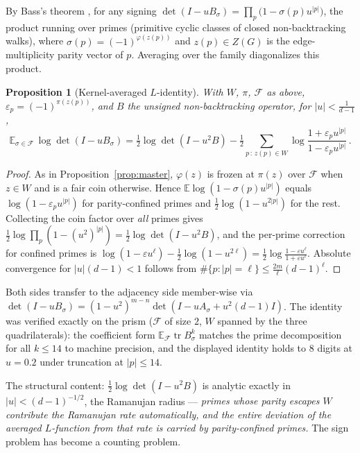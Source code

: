 \documentclass[11pt]{article}
\newtheorem{proposition}[lemma]{Proposition}
\theoremstyle{remark}
\DeclareMathOperator{\tr}{tr}
\begin{document}
By Bass's theorem \cite{bass92}, for any signing
$\det(I-uB_\sigma)=\prod_{p}\big(1-\sigma(p)u^{|p|}\big)$, the product
running over primes (primitive cyclic classes of closed non-backtracking
walks), where $\sigma(p)=(-1)^{\varphi(z(p))}$ and $z(p)\in Z(G)$ is the
edge-multiplicity parity vector of $p$. Averaging over the family
diagonalizes this product.

\begin{proposition}[Kernel-averaged $L$-identity]\label{prop:Lident}
With $W$, $\pi$, $\mathcal F$ as above, $\varepsilon_p=(-1)^{\pi(z(p))}$,
and $B$ the \emph{unsigned} non-backtracking operator, for
$|u|<\tfrac1{d-1}$,
\[
\mathbb E_{\sigma\in\mathcal F}\,\log\det(I-uB_\sigma)
=\tfrac12\log\det(I-u^2B)
-\tfrac12\!\!\sum_{p\,:\,z(p)\in W}\!\!
\log\frac{1+\varepsilon_pu^{|p|}}{1-\varepsilon_pu^{|p|}}\,.
\]
\end{proposition}

\begin{proof}
As in Proposition~\ref{prop:master}, $\varphi(z)$ is frozen at $\pi(z)$
over $\mathcal F$ when $z\in W$ and is a fair coin otherwise. Hence
$\mathbb E\log(1-\sigma(p)u^{|p|})$ equals
$\log(1-\varepsilon_pu^{|p|})$ for parity-confined primes and
$\tfrac12\log(1-u^{2|p|})$ for the rest. Collecting the coin factor over
\emph{all} primes gives
$\tfrac12\log\prod_p(1-(u^2)^{|p|})=\tfrac12\log\det(I-u^2B)$, and the
per-prime correction for confined primes is
$\log(1-\varepsilon u^{\ell})-\tfrac12\log(1-u^{2\ell})
=\tfrac12\log\frac{1-\varepsilon u^{\ell}}{1+\varepsilon u^{\ell}}$.
Absolute convergence for $|u|(d-1)<1$ follows from
$\#\{p:|p|=\ell\}\le\tfrac{2m}{\ell}(d-1)^{\ell}$.
\end{proof}

Both sides transfer to the adjacency side member-wise via
$\det(I-uB_\sigma)=(1-u^2)^{m-n}\det(I-uA_\sigma+u^2(d-1)I)$. The
identity was verified exactly on the prism ($\mathcal F$ of size $2$,
$W$ spanned by the three quadrilaterals): the coefficient form
$\mathbb E_{\mathcal F}\tr B_\sigma^k$ matches the prime decomposition
for all $k\le14$ to machine precision, and the displayed identity holds
to $8$ digits at $u=0.2$ under truncation at $|p|\le14$.

The structural content: $\tfrac12\log\det(I-u^2B)$ is analytic exactly
in $|u|<(d-1)^{-1/2}$, the Ramanujan radius --- \emph{primes whose
parity escapes $W$ contribute the Ramanujan rate automatically, and the
entire deviation of the averaged $L$-function from that rate is carried
by parity-confined primes.} The sign problem has become a counting
problem.
\end{document}
